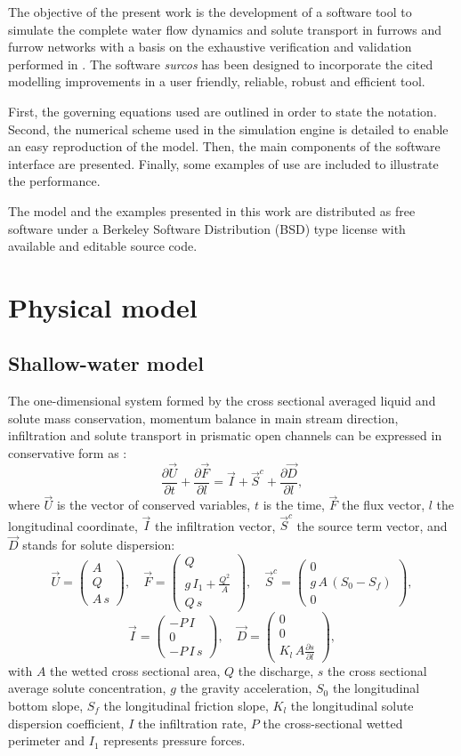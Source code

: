 \documentclass[review,authoryear]{elsarticle}
\newcommand{\eq}[2]{\begin{equation}\label{#2}#1\end{equation}}
\newcommand{\PARTIAL}[2] {\frac{\partial#1}{\partial#2}}
\newcommand{\PA}[1] {\left(#1\right)}
\newcommand{\MATRIX}[2] {\PA{\begin{array}{#1}#2\end{array}}}
\begin{document}
The objective of the present work is the development of a software tool to
simulate the complete water flow dynamics and solute transport in furrows and
furrow networks with a basis on the exhaustive verification and validation
performed in \cite{JaviSurcos1,JaviSurcos2}. The software \emph{surcos} has been
designed to incorporate the cited modelling improvements in a user friendly,
reliable, robust and efficient tool.

First, the governing equations used are outlined in order to state the notation.
Second, the numerical scheme used in the simulation engine is detailed to enable
an easy reproduction of the model. Then, the main components of the software
interface are presented. Finally, some examples of use are included to
illustrate the performance.

The model and the examples presented in this work are distributed
\citep{Surcos,SurcosGit} as free software under a Berkeley Software Distribution
(BSD) type license with available and editable source code.

\section{Physical model}

\subsection{Shallow-water model}

The one-dimensional system formed by the cross sectional averaged liquid and
solute mass conservation, momentum balance in main stream direction,
infiltration and solute transport in prismatic open channels can be expressed in
conservative form as \citep{JaviSurcos1}:
\eq
{
	\PARTIAL{\vec{U}}{t}+\PARTIAL{\vec{F}}{l}=
	\vec{I}+\vec{S}^c+\PARTIAL{\vec{D}}{l},
}{EqCons}
where $\vec{U}$ is the vector of conserved variables, $t$ is the time, $\vec{F}$
the flux vector,  $l$ the longitudinal coordinate, $\vec{I}$ the infiltration
vector, $\vec{S}^c$ the source term vector, and $\vec{D}$ stands for solute
dispersion:
\[
	\vec{U}=\MATRIX{c}{A\\Q\\A\,s},\quad
	\vec{F}=\MATRIX{c}{Q\\g\,I_1+\frac{Q^2}{A}\\Q\,s},\quad
	\vec{S}^c=\MATRIX{c}{0\\g\,A\,\PA{S_0-S_f}\\0},
\]
\eq
{
	\vec{I}=\MATRIX{c}{-P\,I\\0\\-P\,I\,s},\quad
	\vec{D}=\MATRIX{c}{0\\0\\K_l\,A\PARTIAL{s}{l}},
}{EqVar}
with $A$ the wetted cross sectional area, $Q$ the discharge, $s$ the cross
sectional average solute concentration, $g$ the gravity acceleration, $S_0$ the
longitudinal bottom slope, $S_f$ the longitudinal friction slope, $K_l$ the
longitudinal solute dispersion coefficient, $I$ the infiltration rate, $P$ the
cross-sectional wetted perimeter and $I_1$ represents pressure forces.
\end{document}
